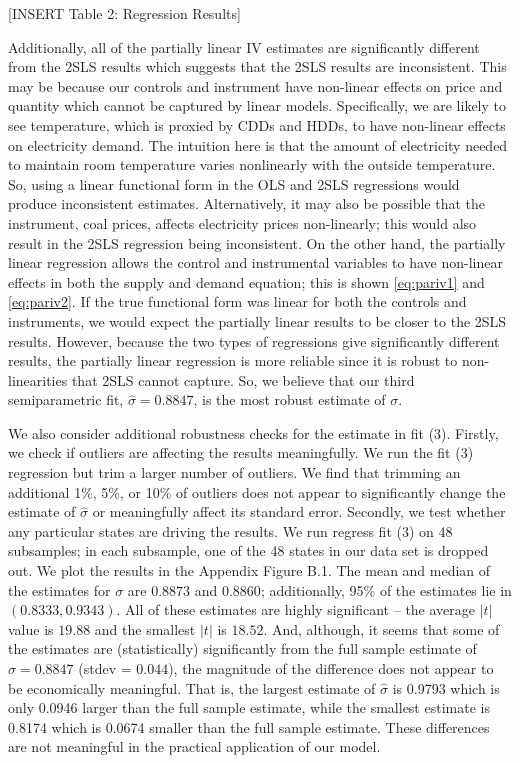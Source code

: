 \documentclass[11pt,a4paper,leqno]{extarticle}
\begin{document}
	
	\vspace{0.15in}
	\begin{center}
		[INSERT Table 2: Regression Results]
	\end{center}
	\vspace{0.15in}
	
	Additionally, all of the partially linear IV estimates are significantly different from the 2SLS results which suggests that the 2SLS results are inconsistent. This may be because our controls and instrument have non-linear effects on price and quantity which cannot be captured by linear models. Specifically, we are likely to see  temperature, which is proxied by CDDs and HDDs, to have non-linear effects on electricity demand. The intuition here is that the amount of electricity needed to maintain room temperature varies nonlinearly with the outside temperature. So, using a linear functional form in the OLS and 2SLS regressions would produce inconsistent estimates.  Alternatively, it may also be possible that the instrument, coal prices, affects electricity prices  non-linearly; this would also result in the 2SLS regression being inconsistent.  On the other hand, the partially linear regression allows the control and instrumental  variables to have non-linear effects in both the supply and demand equation; this is shown \autoref{eq:pariv1} and \autoref{eq:pariv2}.  If the true functional form was linear for both the controls and instruments, we would expect the partially linear results to be closer to the 2SLS results. However, because the two types of regressions give significantly different results, the partially linear regression is more reliable since it is robust to non-linearities that 2SLS cannot capture. So, we believe that our third semiparametric fit, $\hat{\sigma} = 0.8847$, is the most robust estimate of $\sigma$. 
	
	
	We also consider additional robustness checks for the estimate in fit (3). Firstly, we check if outliers are affecting the results meaningfully. We run the fit (3) regression but trim a larger number of outliers. We find that trimming an additional 1\%, 5\%, or 10\% of outliers does not appear to significantly change the estimate of $\hat{\sigma}$ or meaningfully affect its standard error. Secondly, we test whether any particular states are driving the results. We run regress fit (3) on 48 subsamples; in each subsample, one of the 48 states in our data set is dropped out. We plot the results in the Appendix Figure B.1. The mean and median of the estimates for $\sigma$ are  $0.8873$ and $0.8860$; additionally, 95\% of the estimates lie in $(0.8333, 0.9343)$. All of these estimates are highly significant -- the average $|t|$ value is $19.88$ and the smallest $|t|$ is $18.52$. And, although, it seems that some of the estimates are (statistically) significantly  from the full sample estimate of $\hat{\sigma} = 0.8847$ (stdev = $0.044$), the magnitude of the difference does not appear to be economically meaningful. That is, the largest estimate of $\hat{\sigma}$ is 0.9793 which is only 0.0946 larger than the full sample estimate, while the smallest estimate is 0.8174 which is 0.0674 smaller than the full sample estimate. These differences are not meaningful in the practical application of our model.
	
\end{document}
